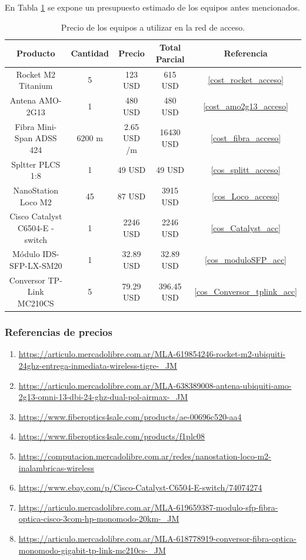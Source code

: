 \documentclass[12pt,a4paper]{book}
\begin{document}
En Tabla \ref{tabla_preciosEquipos} se expone un presupuesto estimado de los equipos antes mencionados.

\begin{table} [H]
\centering
\begin{tabular}{|c|c|c|c|c|}
\hline 
Producto & Cantidad & Precio & Total Parcial & Referencia \\ 
\hline 
Rocket M2 Titanium & 5 & 123 USD & 615 USD & \ref{cost_rocket_acceso}\\ 
\hline 
 Antena AMO-2G13 & 1 & 480 USD & 480 USD & \ref{cost_amo2g13_acceso}\\ 
\hline 
Fibra Mini-Span ADSS 424 & 6200 m & 2.65 USD /m & 16430 USD & \ref{cost_fibra_acceso}\\ 
\hline 
Spltter PLCS 1:8 &1 & 49 USD & 49 USD & \ref{cos_splitt_acceso}\\ 
\hline
NanoStation Loco M2 &  45 & 87 USD & 3915 USD & \ref{cos_Loco_acceso}\\
\hline
Cisco Catalyst C6504-E - switch & 1 & 2246 USD & 2246 USD & \ref{cos_Catalyst_acc} \\
\hline
Módulo IDS-SFP-LX-SM20 & 1 & 32.89 USD & 32.89 USD& \ref{cos_moduloSFP_acc}\\
\hline
Conversor TP-Link MC210CS & 5 & 79.29 USD & 396.45 USD & \ref{cos_Conversor_tplink_acc}\\
\hline


\end{tabular} 
\caption{Precio de los equipos a utilizar en la red de acceso.}
\label{tabla_preciosEquipos}
\end{table}

\subsubsection{Referencias de precios}
\begin{enumerate}
\item \label{cost_rocket_acceso} 
\url{ https://articulo.mercadolibre.com.ar/MLA-619854246-rocket-m2-ubiquiti-
24ghz-entrega-inmediata-wireless-tigre-_JM}
\item \label{cost_amo2g13_acceso}
\url{ https://articulo.mercadolibre.com.ar/MLA-638389008-antena-ubiquiti-amo-
2g13-omni-13-dbi-24-ghz-dual-pol-airmax-_JM}
\item  \label{cost_fibra_acceso}
\url{ https://www.fiberoptics4sale.com/products/ae-00696c520-aa4}
\item  \label{cos_splitt_acceso}
\url{ https://www.fiberoptics4sale.com/products/f1plc08}
\item \label{cos_Loco_acceso}
\url{ https://computacion.mercadolibre.com.ar/redes/nanostation-loco-m2-inalambricas-wireless}
\item \label{cos_Catalyst_acc}
\url{ https://www.ebay.com/p/Cisco-Catalyst-C6504-E-switch/74074274}
\item \label{cos_moduloSFP_acc}
\url{ https://articulo.mercadolibre.com.ar/MLA-619659387-modulo-sfp-fibra-optica-cisco-3com-hp-monomodo-20km-_JM}
\item \label{cos_Conversor_tplink_acc}
\url{ https://articulo.mercadolibre.com.ar/MLA-618778919-conversor-fibra-optica-monomodo-gigabit-tp-link-mc210cs-_JM}
\end{enumerate}
\end{document}
